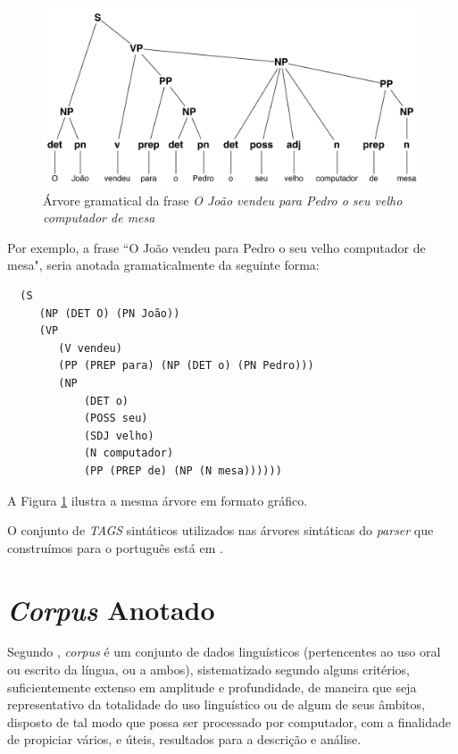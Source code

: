 \begin{figure}
	\begin{center}
		\includegraphics[scale=0.5]{tree.pdf}
		\caption{\label{tree} Árvore gramatical da frase \emph{O João vendeu para Pedro o seu velho computador de mesa}}

	\end{center}
\end{figure}

Por exemplo, a frase ``O João vendeu para Pedro o seu velho computador de mesa", seria anotada gramaticalmente da seguinte forma:

\begin{verbatim}
  (S
     (NP (DET O) (PN João))
     (VP
        (V vendeu)
        (PP (PREP para) (NP (DET o) (PN Pedro)))
        (NP
            (DET o)
            (POSS seu)
            (SDJ velho)
            (N computador)
            (PP (PREP de) (NP (N mesa))))))
\end{verbatim}

			
A Figura \ref{tree} ilustra a mesma árvore em formato gráfico.

O conjunto de \emph{TAGS} sintáticos utilizados nas árvores sintáticas do \emph{parser} que construímos para o português está em \cite{florestasintatica}.




\section{\emph{Corpus} Anotado} %
\label{sec:corpus_anotado}

Segundo \cite{sardinha04}, \emph{corpus} é um conjunto de dados linguísticos (pertencentes ao uso oral ou escrito da língua, ou a ambos), sistematizado segundo alguns critérios, suficientemente extenso em amplitude e profundidade, de maneira que seja representativo da totalidade do uso linguístico ou de algum de seus âmbitos, disposto de tal modo que possa ser processado por computador, com a finalidade de propiciar vários, e úteis, resultados para a descrição e análise.

